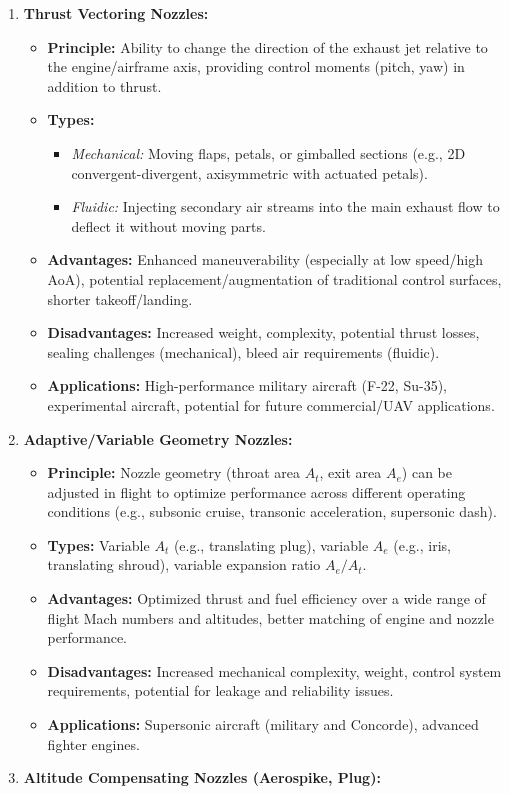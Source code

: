 \begin{enumerate}
\def\labelenumi{\arabic{enumi}.}
\tightlist
\item
  \textbf{Thrust Vectoring Nozzles:}

  \begin{itemize}
  \tightlist
  \item
    \textbf{Principle:} Ability to change the direction of the exhaust
    jet relative to the engine/airframe axis, providing control moments
    (pitch, yaw) in addition to thrust.
  \item
    \textbf{Types:}

    \begin{itemize}
    \tightlist
    \item
      \emph{Mechanical:} Moving flaps, petals, or gimballed sections
      (e.g., 2D convergent-divergent, axisymmetric with actuated
      petals).
    \item
      \emph{Fluidic:} Injecting secondary air streams into the main
      exhaust flow to deflect it without moving parts.
    \end{itemize}
  \item
    \textbf{Advantages:} Enhanced maneuverability (especially at low
    speed/high AoA), potential replacement/augmentation of traditional
    control surfaces, shorter takeoff/landing.
  \item
    \textbf{Disadvantages:} Increased weight, complexity, potential
    thrust losses, sealing challenges (mechanical), bleed air
    requirements (fluidic).
  \item
    \textbf{Applications:} High-performance military aircraft (F-22,
    Su-35), experimental aircraft, potential for future commercial/UAV
    applications.
  \end{itemize}
\item
  \textbf{Adaptive/Variable Geometry Nozzles:}

  \begin{itemize}
  \tightlist
  \item
    \textbf{Principle:} Nozzle geometry (throat area \(A_t\), exit area
    \(A_e\)) can be adjusted in flight to optimize performance across
    different operating conditions (e.g., subsonic cruise, transonic
    acceleration, supersonic dash).
  \item
    \textbf{Types:} Variable \(A_t\) (e.g., translating plug), variable
    \(A_e\) (e.g., iris, translating shroud), variable expansion ratio
    \(A_e/A_t\).
  \item
    \textbf{Advantages:} Optimized thrust and fuel efficiency over a
    wide range of flight Mach numbers and altitudes, better matching of
    engine and nozzle performance.
  \item
    \textbf{Disadvantages:} Increased mechanical complexity, weight,
    control system requirements, potential for leakage and reliability
    issues.
  \item
    \textbf{Applications:} Supersonic aircraft (military and Concorde),
    advanced fighter engines.
  \end{itemize}
\item
  \textbf{Altitude Compensating Nozzles (Aerospike, Plug):}


\end{enumerate}
